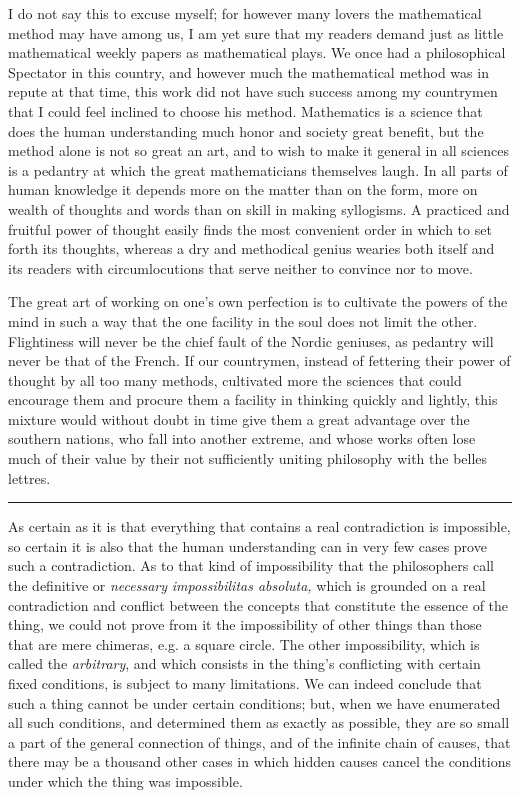\documentclass[12pt,a4paper,openany]{book}
\newcommand{\opage}[1]{\marginnote{\footnotesize\textit{[#1]}}}
\newcommand{\sectionrule}{\par\begin{center}\rule{4em}{0.4pt}\end{center}}
\begin{document}
I do not say this to excuse myself; for however many lovers the mathematical method
may have among us, I am yet sure that my readers demand just as little mathematical
weekly papers as mathematical plays. We once had a philosophical Spectator in this
country, and however much the mathematical method was in repute at that time, this
work did not have such success among my countrymen that I could feel inclined to
choose his method. Mathematics is a science that does the human understanding much
honor and society great benefit, but the method alone is not so great an art, and
to wish to make it general in all sciences is a pedantry at which the
\setcounter{footnote}{0}%
\opage{31}great mathematicians themselves laugh. In all parts of human knowledge it
depends more on the matter than on the form, more on wealth of thoughts and words
than on skill in making syllogisms. A practiced and fruitful power of thought
easily finds the most convenient order in which to set forth its thoughts, whereas
a dry and methodical genius wearies both itself and its readers with circumlocutions
that serve neither to convince nor to move.

The great art of working on one's own perfection is to cultivate the powers of the
mind in such a way that the one facility in the soul does not limit the other.
Flightiness will never be the chief fault of the Nordic geniuses, as pedantry will
never be that of the French. If our countrymen, instead of fettering their power of
thought by all too many methods, cultivated more the sciences that could encourage
them and procure them a facility in thinking quickly and lightly, this mixture
would without doubt in time give them a great advantage over the southern nations,
who fall into another extreme, and whose works often lose much of their value by
their not sufficiently uniting philosophy with the belles lettres.


\sectionrule

As certain as it is that everything that contains a real contradiction is
impossible, so certain it is also that the human understanding can in very few
cases prove such a contradiction. As to that kind of impossibility that the
philosophers call the definitive or \emph{necessary} \textit{impossibilitas
absoluta,} which is grounded on a real contradiction and conflict between the
concepts that constitute the essence of the thing, we could not prove from it the
impossibility of other things than those that are mere chimeras, e.g. a square
circle. The other impossibility, which is called the \emph{arbitrary}, and which
consists in the thing's conflicting with certain fixed conditions, is subject to
many limitations. We can indeed conclude that
\setcounter{footnote}{0}%
\opage{32}such a thing cannot be under certain conditions; but, when we have
enumerated all such conditions, and determined them as exactly as possible, they
are so small a part of the general connection of things, and of the infinite chain
of causes, that there may be a thousand other cases in which hidden causes cancel
the conditions under which the thing was impossible.
\end{document}
